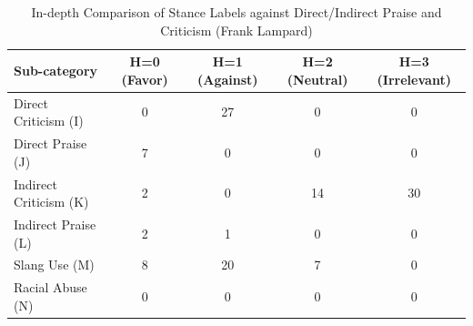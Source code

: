 \documentclass{article}
\begin{document}
\begin{table}[htbp] %
    \centering %
    \caption{In-depth Comparison of Stance Labels against Direct/Indirect Praise and Criticism (Frank Lampard)} %
    \label{tab:statistical_summary_h} %
    \renewcommand{\arraystretch}{1.2} %
    \begin{adjustbox}{max width=\linewidth} %
        \begin{tabular}{l c c c c} %
            \toprule %
            \textbf{Sub-category} & \textbf{H=0 (Favor)} & \textbf{H=1 (Against)} & \textbf{H=2 (Neutral)} & \textbf{H=3 (Irrelevant)} \\ %
            \midrule %
            Direct Criticism (I)  & 0 & 27 & 0  & 0 \\
            Direct Praise (J)     & 7 & 0  & 0  & 0 \\
            Indirect Criticism (K) & 2 & 0  & 14 & 30 \\ %
            Indirect Praise (L)   & 2 & 1  & 0  & 0 \\
            Slang Use (M)         & 8 & 20 & 7  & 0 \\ %
            Racial Abuse (N)      & 0 & 0  & 0  & 0 \\
            \bottomrule %
        \end{tabular}
    \end{adjustbox}
\end{table}

\clearpage
\end{document}
